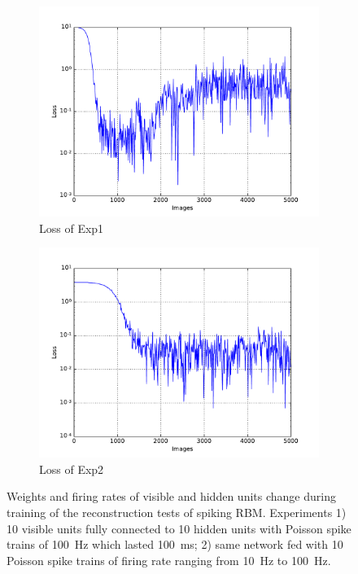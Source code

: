\begin{figure}
\begin{subfigure}[t]{0.4\textwidth}
		\includegraphics[width=\textwidth]{pics_sdlm/15_exp_SRBM_teach_long/exp1_mse_nons.pdf}
		\caption{Loss of Exp1}
	\end{subfigure}
	\begin{subfigure}[t]{0.4\textwidth}
		\includegraphics[width=\textwidth]{pics_sdlm/15_exp_SRBM_teach_long/exp2_mse_nons.pdf}
		\caption{Loss of Exp2}
	\end{subfigure}
	\caption{Weights and firing rates of visible and hidden units change during training of the reconstruction tests of spiking RBM. 
		Experiments 1) 10 visible units fully connected to 10 hidden units with Poisson spike trains of 100~Hz which lasted 100~ms; 2) same network fed with 10 Poisson spike trains of firing rate ranging from 10~Hz to 100~Hz.}
\end{figure}

